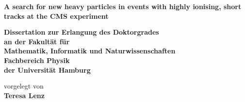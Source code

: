 \begin{titlepage}
   \begin{center}
     \thispagestyle{empty}
     \vspace*{0.1cm}
     \linespread{1.5}
       {\huge\bfseries A search for new heavy particles in events with highly ionising, short tracks at the CMS experiment\par}
       \begin{Large} 
         \textbf{Dissertation zur Erlangung des Doktorgrades\\
                 an der Fakult\"{a}t f\"{u}r\\
                 Mathematik, Informatik und Naturwissenschaften\\
                 Fachbereich Physik\\
                 der Universit\"{a}t Hamburg\\}
       \end{Large}
       \vskip2cm
       \begin{large}
         vorgelegt von\\
         {\bf Teresa Lenz}
         \vfill
       \end{large}
   \end{center}
 \end{titlepage}
 
